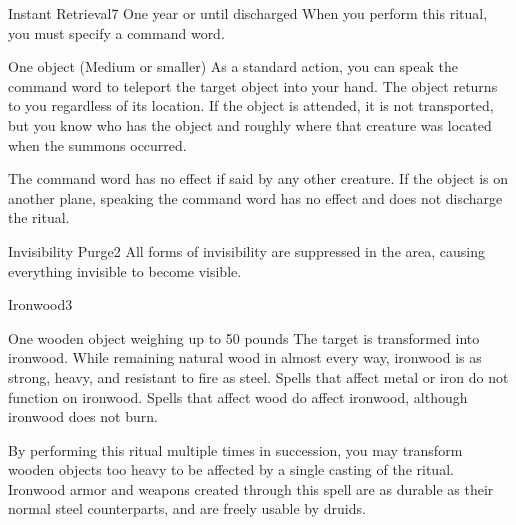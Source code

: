 \begin{spellsection}{Instant Retrieval}{7}
\spelldur One year or until discharged
\spellspecial When you perform this ritual, you must specify a command word.
\begin{spelltarget}{One object (Medium or smaller)}
    \spelleffect As a standard action, you can speak the command word to teleport the target object into your hand. The object returns to you regardless of its location. If the object is attended, it is not transported, but you know who has the object and roughly where that creature was located when the summons occurred.
\end{spelltarget}
\spellnotes The command word has no effect if said by any other creature. If the object is on another plane, speaking the command word has no effect and does not discharge the ritual.
\end{spellsection}

\begin{spellsection}{Invisibility Purge}{2}
\spelldur \durlong \dismissable
{}
\spellline
\spelleffect All forms of invisibility are suppressed in the area, causing everything invisible to become visible.
\end{spellsection}

\begin{spellsection}{Ironwood}{3}
\begin{spelltarget}{One wooden object weighing up to 50 pounds}
    \spelleffect The target is transformed into ironwood. While remaining natural wood in almost every way, ironwood is as strong, heavy, and resistant to fire as steel. Spells that affect metal or iron do not function on ironwood. Spells that affect wood do affect ironwood, although ironwood does not burn.
\end{spelltarget}
\spellnotes By performing this ritual multiple times in succession, you may transform wooden objects too heavy to be affected by a single casting of the ritual. Ironwood armor and weapons created through this spell are as durable as their normal steel counterparts, and are freely usable by druids.
\end{spellsection}


